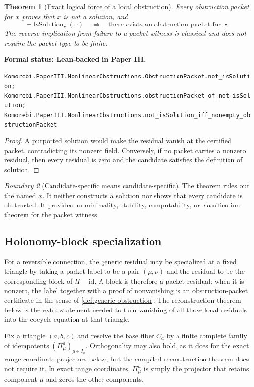 \documentclass[11pt]{article}
\newtheorem{theorem}{Theorem}[section]
\theoremstyle{definition}
\theoremstyle{remark}
\newtheorem{boundary}[theorem]{Boundary}
\newcommand{\id}{\mathrm{id}}
\newcommand{\leanname}[1]{\nolinkurl{#1}}
\newcommand{\statusleanthree}[1]{%
  \par\smallskip\noindent
  {\color{leanblue}\textbf{Formal status: Lean-backed in Paper III.}}\par
  \begingroup\small\raggedright\leanname{#1}\par\endgroup\smallskip}
\begin{document}
\begin{theorem}[Exact logical force of a local obstruction]
\label{thm:generic-obstruction}
Every obstruction packet for $x$ proves that $x$ is not a solution, and
\[
\neg\operatorname{IsSolution}_r(x)
\quad\Longleftrightarrow\quad
\text{there exists an obstruction packet for }x.
\]
The reverse implication from failure to a packet witness is classical and
does not require the packet type to be finite.
\end{theorem}
\statusleanthree{Komorebi.PaperIII.NonlinearObstructions.ObstructionPacket.not_isSolution; Komorebi.PaperIII.NonlinearObstructions.obstructionPacket_of_not_isSolution; Komorebi.PaperIII.NonlinearObstructions.not_isSolution_iff_nonempty_obstructionPacket}

\begin{proof}
A purported solution would make the residual vanish at the certified packet,
contradicting its nonzero field.  Conversely, if no packet carries a nonzero
residual, then every residual is zero and the candidate satisfies the
definition of solution.
\end{proof}

\begin{boundary}[Candidate-specific means candidate-specific]
The theorem rules out the named $x$.  It neither constructs a solution nor
shows that every candidate is obstructed.  It provides no minimality,
stability, computability, or classification theorem for the packet witness.
\end{boundary}

\subsection{Holonomy-block specialization}

For a reversible connection, the generic residual may be specialized at a
fixed triangle by taking a packet label to be a pair $(\mu,\nu)$ and the
residual to be the corresponding block of $H-\id$.  A block is therefore a
packet residual; when it is nonzero, the label together with a proof of
nonvanishing is an obstruction-packet certificate in the sense of
\cref{def:generic-obstruction}.  The reconstruction theorem below is the extra
statement needed to turn vanishing of all those local residuals into the
cocycle equation at that triangle.

Fix a triangle $(a,b,c)$ and resolve the base fiber $C_a$ by a finite complete
family of idempotents $(\Pi^a_\mu)_{\mu\in I_a}$.  Orthogonality may also hold,
as it does for the exact range-coordinate projectors below, but the compiled
reconstruction theorem does not require it.  In exact range coordinates,
$\Pi^a_\mu$ is simply the projector that retains component $\mu$ and zeros
the other components.
\end{document}

